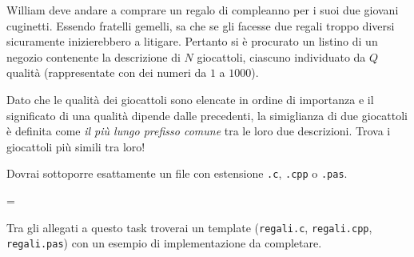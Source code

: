 \usepackage{xcolor}
\usepackage{afterpage}
\usepackage{pifont,mdframed}
\usepackage[bottom]{footmisc}

\makeatletter
\gdef\this@inputfilename{input.txt}
\gdef\this@outputfilename{output.txt}
\makeatother

\newcommand{\inputfile}{\texttt{input.txt}}
\newcommand{\outputfile}{\texttt{output.txt}}

\newenvironment{warning}
  {\par\begin{mdframed}[linewidth=2pt,linecolor=gray]%
    \begin{list}{}{\leftmargin=1cm
                   \labelwidth=\leftmargin}\item[\Large\ding{43}]}
  {\end{list}\end{mdframed}\par}

	William deve andare a comprare un regalo di compleanno per i suoi due giovani cuginetti. Essendo fratelli gemelli, sa che se gli facesse due regali troppo diversi sicuramente inizierebbero a litigare. Pertanto si \`e procurato un listino di un negozio contenente la descrizione di $N$ giocattoli, ciascuno individuato da $Q$ qualit\`a (rappresentate con dei numeri da $1$ a $1000$).

	Dato che le qualit\`a dei giocattoli sono elencate in ordine di importanza e il significato di una qualit\`a dipende dalle precedenti, la simiglianza di due giocattoli \`e definita come \emph{il pi\`u lungo prefisso comune} tra le loro due descrizioni. Trova i giocattoli pi\`u simili tra loro!

\Implementation
Dovrai sottoporre esattamente un file con estensione \texttt{.c}, \texttt{.cpp} o \texttt{.pas}.

\begin{warning}
Tra gli allegati a questo task troverai un template (\texttt{regali.c}, \texttt{regali.cpp}, \texttt{regali.pas}) con un esempio di implementazione da completare.
\end{warning}

